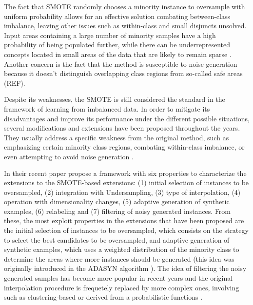 \documentclass[parskip=full]{scrartcl}
\begin{document}
The fact that SMOTE randomly chooses a minority instance to oversample with
uniform probability allows for an effective solution combating between-class
imbalance, leaving other issues such as within-class and small disjuncts
unsolved. Input areas containing a large number of minority samples have a high
probability of being populated further, while there can be underrepresented
concepts located in small areas of the data that are likely to remain sparse
\cite{Fernandez2018}. Another concern is the fact that the method is susceptible
to noise generation because it doesn’t distinguish overlapping class regions
from so-called safe areas (REF).

Despite its weaknesses, the SMOTE is still considered the standard in the
framework of learning from imbalanced data. In order to mitigate its
disadvantages and improve its performance under the different possible
situations, several modifications and extensions have been proposed throughout
the years. They usually address a specific weakness from the original method,
such as emphasizing certain minority class regions, combating within-class
imbalance, or even attempting to avoid noise generation \cite{Douzas2018}.

In their recent paper \cite{Fernandez2018} propose a framework with six
properties to characterize the extensions to the SMOTE-based extensions: (1)
initial selection of instances to be oversampled, (2) integration with
Undersampling, (3) type of interpolation, (4) operation with dimensionality
changes, (5) adaptive generation of synthetic examples, (6) relabeling and (7)
filtering of noisy generated instances. From these, the most exploit properties
in the extensions that have been proposed are the initial selection of instances
to be oversampled, which consists on the strategy to select the best candidates
to be oversampled, and adaptive generation of synthetic examples, which uses a
weighted distribution of the minority class to determine the areas where more
instances should be generated (this idea was originally introduced in the ADASYN
algorithm \cite{He2008}). The idea of filtering the noisy generated samples has
become more popular in recent years and the original interpolation procedure is
frequetely replaced by more complex ones, involving such as clustering-based or
derived from a probabilistic functions \cite{Fernandez2018}.
\end{document}
